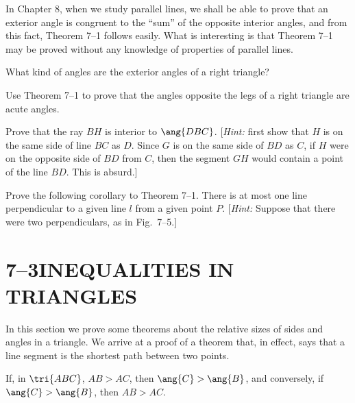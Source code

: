 \documentclass[11pt]{book}
\theoremstyle{bkplain}
\theoremstyle{XIplainnote}
\theoremstyle{bkplain}
\theoremstyle{bkplain}
\begin{document}
\FIGVIIFOUR

\begin{remark}
In Chapter 8, when we study parallel lines, we shall be able to prove that an
exterior angle is congruent to the ``sum'' of the opposite interior angles, and
from this fact, Theorem 7--1 follows easily. What is interesting is that
Theorem 7--1 may be proved without any knowledge of properties of parallel
lines.
\end{remark}

\begin{exercisecols}
\begin{exlist}
\item What kind of angles are the exterior angles of a right triangle?
\item Use Theorem 7--1 to prove that the angles opposite the legs of a right
  triangle are acute angles.
\item[\stex 3.] Prove that the ray $BH$ is interior to $\ang{DBC}$.
  [\emph{Hint:} first show that $H$ is on the same side of line $BC$ as $D$.
  Since $G$ is on the same side of $BD$ as $C$, if $H$ were on the opposite
  side of $BD$ from $C$, then the segment $GH$ would contain a point of the
  line $BD$. This is absurd.]
\item Prove the following corollary to Theorem 7--1. There is at most one line
  perpendicular to a given line $l$ from a given point $P$. [\emph{Hint:}
  Suppose that there were two perpendiculars, as in Fig.~7--5.]
\exfig{\FIGVIIFIVE}
\end{exlist}
\end{exercisecols}

\section*{7--3\quad INEQUALITIES IN TRIANGLES}

In this section we prove some theorems about the relative sizes of sides and
angles in a triangle. We arrive at a proof of a theorem that, in effect, says
that a line segment is the shortest path between two points.

\begin{theorem}
If, in $\tri{ABC}$, $AB > AC$, then $\ang{C} > \ang{B}$, and conversely, if
$\ang{C} > \ang{B}$, then $AB > AC$.
\end{theorem}
\end{document}
